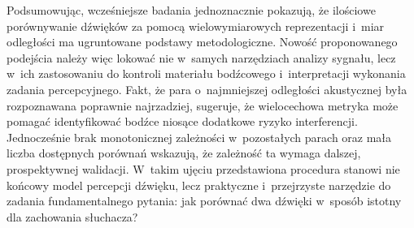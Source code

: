 \documentclass{article}
\begin{document}
Podsumowując, wcześniejsze badania jednoznacznie pokazują, że ilościowe porównywanie dźwięków za pomocą wielowymiarowych reprezentacji i~miar odległości ma ugruntowane podstawy metodologiczne. Nowość proponowanego podejścia należy więc lokować nie w~samych narzędziach analizy sygnału, lecz w~ich zastosowaniu do kontroli materiału bodźcowego i~interpretacji wykonania zadania percepcyjnego. Fakt, że para o~najmniejszej odległości akustycznej była rozpoznawana poprawnie najrzadziej, sugeruje, że wielocechowa metryka może pomagać identyfikować bodźce niosące dodatkowe ryzyko interferencji. Jednocześnie brak monotonicznej zależności w~pozostałych parach oraz mała liczba dostępnych porównań wskazują, że zależność ta wymaga dalszej, prospektywnej walidacji. W~takim ujęciu przedstawiona procedura stanowi nie końcowy model percepcji dźwięku, lecz praktyczne i~przejrzyste narzędzie do zadania fundamentalnego pytania: jak porównać dwa dźwięki w~sposób istotny dla zachowania słuchacza?





\end{document}

